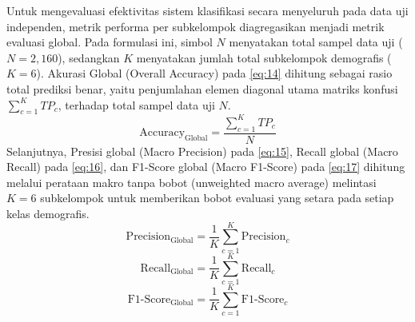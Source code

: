 Untuk mengevaluasi efektivitas sistem klasifikasi secara menyeluruh pada data uji independen, metrik performa per subkelompok diagregasikan menjadi metrik evaluasi global. Pada formulasi ini, simbol $N$ menyatakan total sampel data uji ($N=2,160$), sedangkan $K$ menyatakan jumlah total subkelompok demografis ($K=6$). Akurasi Global (Overall Accuracy) pada \eqref{eq:14} dihitung sebagai rasio total prediksi benar, yaitu penjumlahan elemen diagonal utama matriks konfusi $\sum_{c=1}^K TP_c$, terhadap total sampel data uji $N$.
\begin{equation}
\text{Accuracy}_{\text{Global}} = \frac{\sum_{c=1}^K TP_c}{N}
\label{eq:14}
\end{equation}
Selanjutnya, Presisi global (Macro Precision) pada \eqref{eq:15}, Recall global (Macro Recall) pada \eqref{eq:16}, dan F1-Score global (Macro F1-Score) pada \eqref{eq:17} dihitung melalui perataan makro tanpa bobot (unweighted macro average) melintasi $K=6$ subkelompok untuk memberikan bobot evaluasi yang setara pada setiap kelas demografis.
\begin{equation}
\text{Precision}_{\text{Global}} = \frac{1}{K} \sum_{c=1}^K \text{Precision}_c
\label{eq:15}
\end{equation}
\begin{equation}
\text{Recall}_{\text{Global}} = \frac{1}{K} \sum_{c=1}^K \text{Recall}_c
\label{eq:16}
\end{equation}
\begin{equation}
\text{F1-Score}_{\text{Global}} = \frac{1}{K} \sum_{c=1}^K \text{F1-Score}_c
\label{eq:17}
\end{equation}
